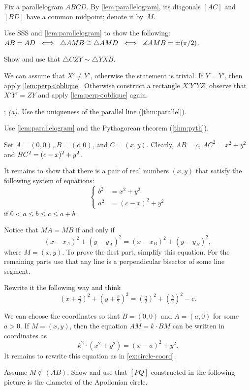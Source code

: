 Fix a parallelogram $ABCD$.
By \ref{lem:parallelogram},
its diagonals $[AC]$ and $[BD]$ have a common midpoint; denote it by~$M$.

Use SSS and \ref{lem:parallelogram} to show the following:
$AB=AD\ \iff\ \triangle AMB
\cong
\triangle AMD\ \z\iff\ \measuredangle AMB
=
\pm\tfrac\pi2$.

Show and use that $\triangle CZY\sim\triangle YXB$.

We can assume that $X'\ne Y'$, otherwise the statement is trivial.
If $Y=Y'$, then apply \ref{lem:perp<oblique}.
Otherwise construct a rectangle $X'Y'YZ$, observe that $X'Y'=ZY$ and apply \ref{lem:perp<oblique} again.

\parbf{\ref{ex:coordinates}}; \textit{(a).} Use the uniqueness of the parallel line (\ref{thm:parallel}).

 Use \ref{lem:parallelogram} and the Pythagorean theorem (\ref{thm:pyth}).

Set $A=(0,0)$, $B=(c,0)$, and $C=(x,y)$.
Clearly, $AB=c$,
$AC^2=x^2+y^2$ and $BC^2\z=(c-x)^2+y^2$.

It remains to show that there is a pair of real numbers $(x,y)$ 
that satisfy the following system of equations:
$$
\left\{
\begin{aligned}
b^2&=x^2+y^2
\\
a^2&=(c-x)^2+y^2
\end{aligned}
\right.
$$
if $0<a\le b\le c\le a+b$.

Notice that $MA=MB$ if and only if
\[(x-x_A)^2+(y-y_A)^2=(x-x_B)^2+(y-y_B)^2,\]
where $M=(x,y)$. 
To prove the first part, simplify this equation.
For the remaining parts use that any line is a perpendicular bisector of some line segment.

 Rewrite it the following way and think 
\[(x+\tfrac a2)^2+(y+\tfrac b2)^2=(\tfrac a2)^2+(\tfrac b2)^2-c.\]


We can choose the coordinates so that $B=(0,0)$ and $A=(a,0)$ for some $a>0$.
If $M=(x,y)$, then the equation $AM=k\cdot BM$ can be written in coordinates as 
\[k^2\cdot(x^2+y^2)=(x-a)^2+y^2.\]
It remains to rewrite this equation as in \ref{ex:circle-coord}.

Assume $M\notin(AB)$.
Show and use that $[PQ]$ constructed in the following picture is the diameter of the Apollonian circle.

